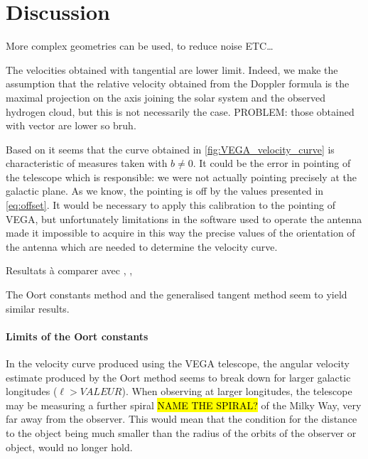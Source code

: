 \section{Discussion}
More complex geometries can be used, to reduce noise ETC\ldots \cite{burke_introduction_2013}

The velocities obtained with tangential are lower limit.
Indeed, we make the assumption that the relative velocity obtained from the Doppler formula is the maximal projection on the axis joining the solar system and the observed hydrogen cloud, but this is not necessarily the case.
PROBLEM: those obtained with vector are lower so bruh.

Based on \cite{sakhawat_hossain_salsa_2018} it seems that the curve obtained in \autoref{fig:VEGA_velocity_curve} is characteristic of measures taken with $b \neq 0$. It could be the error in pointing of the telescope which is responsible: we were not actually pointing precisely at the galactic plane. As we know, the pointing is off by the values presented in \autoref{eq:offset}.
It would be necessary to apply this calibration to the pointing of VEGA, but unfortunately limitations in the software used to operate the antenna made it  impossible to acquire in this way the precise values of the orientation of the antenna which are needed to determine the velocity curve.

Resultats à comparer avec \cite{ou_dark_2024}, \cite{jia_research_2022}, \cite{mroz_rotation_2019}

The Oort constants method and the generalised tangent method seem to yield similar results.

\paragraph{Limits of the Oort constants}
In the velocity curve produced using the VEGA telescope, the angular velocity estimate produced by the Oort method seems to break down for larger galactic longitudes ($\ell > VALEUR$). When observing at larger longitudes, the telescope may be measuring a further spiral \hl{NAME THE SPIRAL?} of the Milky Way, very far away from the observer. This would mean that the condition for the distance to the object being much smaller than the radius of the orbits of the observer or object, would no longer hold. 

